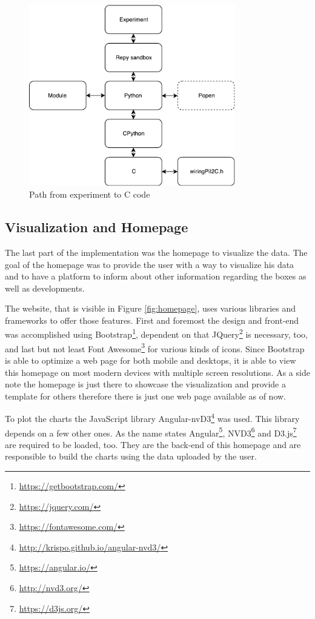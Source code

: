 \documentclass[bachelorthesis, grey, english]{mas-thesis-chapters} %
\begin{document}
\begin{figure}[ht]
	\centering
	\includegraphics[width=9cm]{CPython_Workflow.pdf}
	\caption{Path from experiment to C code}
	\label{fig:cPython}
\end{figure}

\subsection{Visualization and Homepage}

The last part of the implementation was the homepage to visualize the data. The goal of the homepage was to provide the user with a way to visualize his data and to have a platform to inform about other information regarding the boxes as well as developments.

The website, that is visible in Figure \ref{fig:homepage}, uses various libraries and frameworks to offer those features. First and foremost the design and front-end was accomplished using Bootstrap\footnote{\url{https://getbootstrap.com/}}, dependent on that JQuery\footnote{\url{https://jquery.com/}} is necessary, too, and last but not least Font Awesome\footnote{\url{https://fontawesome.com/}} for various kinds of icons. Since Bootstrap is able to optimize a web page for both mobile and desktops, it is able to view this homepage on most modern devices with multiple screen resolutions. As a side note the homepage is just there to showcase the visualization and provide a template for others therefore there is just one web page available as of now.

To plot the charts the JavaScript library Angular-nvD3\footnote{\url{http://krispo.github.io/angular-nvd3/}} was used. This library depends on a few other ones. As the name states Angular\footnote{\url{https://angular.io/}}, NVD3\footnote{\url{http://nvd3.org/}} and D3.js\footnote{\url{https://d3js.org/}} are required to be loaded, too. They are the back-end of this homepage and are responsible to build the charts using the data uploaded by the user.
\end{document}
